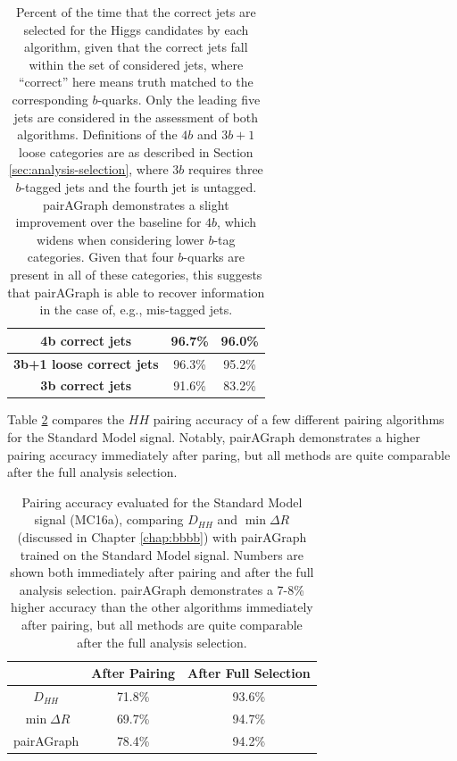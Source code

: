 \begin{table}
\centering
\begin{tabular}{|c | c | c|}
\hline
\textbf{4b correct jets} & 96.7\% & 96.0\%\\
\hline
\textbf{3b+1 loose correct jets} & 96.3\% & 95.2\%\\
\hline
\textbf{3b correct jets} & 91.6\% & 83.2\%\\
\hline
\end{tabular}
\caption{\label{tbl:pag-jet-sel} Percent of the time that the correct jets are selected for the 
Higgs candidates by each algorithm, given that the correct jets fall within the set of considered jets,  
where ``correct'' here means truth matched to the corresponding $b$-quarks. Only the leading five jets 
are considered in the assessment of both algorithms. Definitions of the $4b$ and $3b+1$ loose categories 
are as described in Section \ref{sec:analysis-selection}, where $3b$ requires three $b$-tagged jets and 
the fourth jet is untagged. pairAGraph demonstrates a slight improvement over the 
baseline for $4b$, which widens when considering lower $b$-tag categories. Given that four $b$-quarks are present 
in all of these categories, this suggests that pairAGraph is able to recover information in the case of, 
e.g., mis-tagged jets.}
\end{table}


Table \ref{tbl:pag-accuracy} compares the $HH$ pairing accuracy of a few different pairing algorithms for the 
Standard Model signal. Notably, pairAGraph demonstrates a higher pairing accuracy immediately after paring, 
but all methods are quite comparable after the full analysis selection.
\begin{table}
\centering
\begin{tabular}{|c | c | c|}
\hline
&\textbf{After Pairing} & \textbf{After Full Selection}\\
\hline \hline
$D_{HH}$ & 71.8\% & 93.6\% \\
\hline
$\min{\Delta R}$ & 69.7\% & 94.7\% \\
\hline
pairAGraph & 78.4\% & 94.2\%\\
\hline
\end{tabular}
\caption{\label{tbl:pag-accuracy} Pairing accuracy evaluated for the Standard Model signal (MC16a), comparing 
$D_{HH}$ and $\min{\Delta R}$ (discussed in Chapter \ref{chap:bbbb}) with pairAGraph trained on the Standard Model 
signal. Numbers are shown both immediately after pairing and after the full analysis selection. pairAGraph demonstrates 
a 7-8\% higher accuracy than the other algorithms immediately after pairing, but all methods are quite comparable after 
the full analysis selection.}
\end{table}

